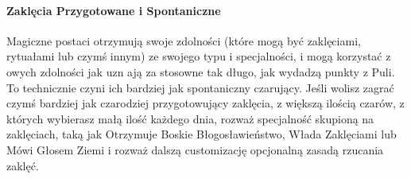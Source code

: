 \paragraph{Zaklęcia Przygotowane i Spontaniczne}

Magiczne postaci otrzymują swoje zdolności (które mogą być zaklęciami, rytuałami lub czymś innym) ze swojego typu i specjalności, i mogą korzystać z owych zdolności jak uzn ają za stosowne tak długo, jak wydadzą punkty z Puli. To technicznie czyni ich bardziej jak spontaniczny czarujący. Jeśli wolisz zagrać czymś bardziej jak czarodziej przygotowujący zaklęcia, z większą ilością czarów, z których wybierasz małą ilość każdego dnia, rozważ specjalność skupioną na zaklęciach, taką jak Otrzymuje Boskie Błogosławieństwo, Włada Zaklęciami lub Mówi Głosem Ziemi i rozważ dalszą customizację opcjonalną zasadą rzucania zaklęć. 